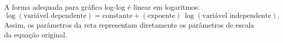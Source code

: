 A forma adequada para gráfico log-log é linear em logaritmos:
\[
\log(\text{variável dependente}) = \text{constante} + (\text{expoente})\,\log(\text{variável independente}).
\]
Assim, os parâmetros da reta representam diretamente os parâmetros de escala da equação original.

